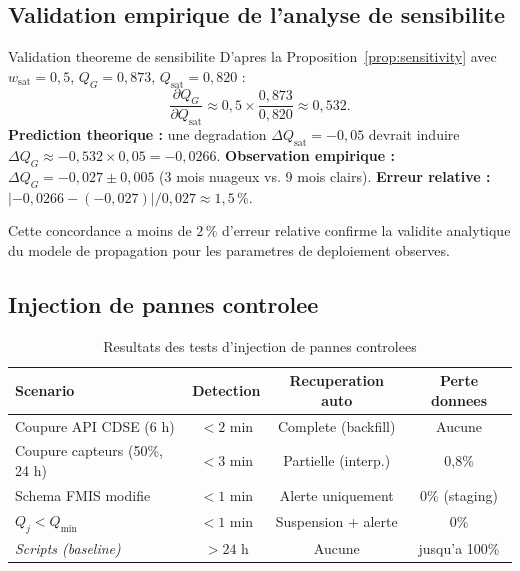 \documentclass[12pt,a4paper]{article}
\theoremstyle{plain}
\theoremstyle{definition}
\theoremstyle{remark}
\begin{document}
\subsection{Validation empirique de l'analyse de sensibilite}
\label{subsec:sensitivity_validation}

\begin{mathbox}{Validation theoreme de sensibilite}
D'apres la Proposition~\ref{prop:sensitivity} avec $w_{\text{sat}}=0{,}5$,
$Q_G=0{,}873$, $Q_{\text{sat}}=0{,}820$ :
\[
\frac{\partial Q_G}{\partial Q_{\text{sat}}} \approx
0{,}5 \times \frac{0{,}873}{0{,}820} \approx 0{,}532.
\]
\textbf{Prediction theorique :} une degradation $\Delta Q_{\text{sat}} = -0{,}05$
devrait induire $\Delta Q_G \approx -0{,}532 \times 0{,}05 = -0{,}0266$.
\textbf{Observation empirique :} $\Delta Q_G = -0{,}027 \pm 0{,}005$
(3 mois nuageux vs. 9 mois clairs).
\textbf{Erreur relative :} $|{-}0{,}0266 - ({-}0{,}027)| / 0{,}027 \approx 1{,}5\,\%$.
\end{mathbox}

Cette concordance a moins de $2\,\%$ d'erreur relative confirme la
validite analytique du modele de propagation pour les parametres de
deploiement observes.

\subsection{Injection de pannes controlee}

\begin{table}[H]
\caption{Resultats des tests d'injection de pannes controlees}
\label{tab:failure}
\centering\small
\renewcommand{\arraystretch}{1.35}
\begin{tabularx}{\linewidth}{Xccc}
\toprule
\textbf{Scenario} & \textbf{Detection} &
\textbf{Recuperation auto} & \textbf{Perte donnees} \\
\midrule
\rowcolor{lightblue!30}
Coupure API CDSE (6 h)       & $<2$ min & Complete (backfill) & Aucune \\
Coupure capteurs (50\%, 24 h)& $<3$ min & Partielle (interp.) & 0,8\% \\
\rowcolor{lightblue!30}
Schema FMIS modifie          & $<1$ min & Alerte uniquement   & 0\% (staging) \\
$Q_j < Q_{\min}$             & $<1$ min & Suspension + alerte & 0\% \\
\midrule
\textit{Scripts (baseline)}  & $>24$ h  & Aucune & jusqu'a 100\% \\
\bottomrule
\end{tabularx}
\end{table}
\end{document}
